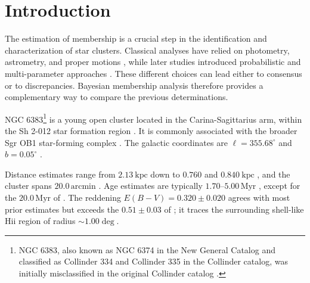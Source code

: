 \documentclass{aa}
\begin{document}


   \maketitle
\nolinenumbers

\section{Introduction}\label{S_intro}
The estimation of membership is a crucial step in the identification and characterization of star clusters. Classical analyses have relied on photometry, astrometry, and proper motions \citep{1930LicOB..14..154T,1949ApJ...110..117S,1978MNRAS.182..607F,1968ArA.....5....1L}, while later studies introduced probabilistic and multi-parameter approaches \citep{1989MNRAS.236..263P,1991MNRAS.249...76B,2005AA...438.1163K,2007AA...462..157P,2018AA...610A..30A}. These different choices can lead either to consensus or to discrepancies. Bayesian membership analysis therefore provides a complementary way to compare the previous determinations.

NGC 6383\footnote{NGC 6383, also known as NGC 6374 in the New General Catalog \citep{2008hsf2.book..497R} and classified as Collinder 334 and Collinder 335 in the Collinder catalog, was initially misclassified in the original Collinder catalog \citep{1931AnLun...2....1C}.} is a young open cluster located in the Carina-Sagittarius arm, within the Sh 2-012 star formation region \citep{1959ApJS....4..257S}. It is commonly associated with the broader Sgr OB1 star-forming complex \citep{2008hsf2.book..497R}. The galactic coordinates are $\ell = 355.68^{\circ}$ and $b = 0.05^{\circ}$ \citep{2017A&A...600A.106C}.

Distance estimates range from $2.13~\mathrm{kpc}$ \citep{1930LicOB..14..154T} down to $0.760$ \citep{1949ApJ...110..117S} and $0.840~\mathrm{kpc}$ \citep{2018AA...610A..30A}, and the cluster spans $20.0\,\textrm{arcmin}$ \citep{2013A&A...560A..76M}. Age estimates are typically $1.70$--$5.00\,\textrm{Myr}$ \citep{1978MNRAS.182..607F,1989MNRAS.236..263P,1991MNRAS.249...76B,2005AA...438.1163K,2007AA...462..157P}, except for the $20.0\,\textrm{Myr}$ of \citet{1968ArA.....5....1L}. The reddening $E(B-V) = 0.320 \pm 0.020$ \citep{2008hsf2.book..497R} agrees with most prior estimates \citep{1971AAS....4..241B,1978MNRAS.182..607F,1978MNRAS.184..661L,1985AA...151..391T,1989MNRAS.236..263P,1994RMxAA..29..141F,2007AA...462..157P} but exceeds the $0.51 \pm 0.03$ of \citet{2018AA...610A..30A}; it traces the surrounding shell-like H{\sc ii} region of radius $\sim1.00\deg$.
\end{document}
